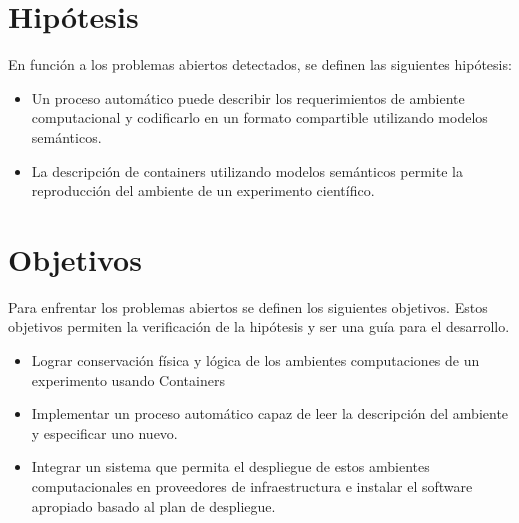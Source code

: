 \section{Hipótesis}

En función a los problemas abiertos detectados, se definen las siguientes hipótesis:

\begin{itemize}
	\item Un proceso automático puede describir los requerimientos de ambiente computacional y codificarlo en un formato compartible  utilizando modelos semánticos.
	\item La descripción de containers utilizando modelos semánticos permite la reproducción del ambiente de un experimento científico.
\end{itemize}


\section{Objetivos}

Para enfrentar los problemas abiertos se definen los siguientes objetivos. Estos objetivos permiten la verificación de la hipótesis y ser una guía para el desarrollo.



\begin{itemize}
	\item Lograr conservación física y lógica de los ambientes computaciones de un experimento usando Containers
	\item Implementar un proceso automático capaz de leer la descripción del ambiente y especificar uno nuevo.
	\item Integrar un sistema que permita el despliegue de estos ambientes computacionales en proveedores de infraestructura e instalar el software apropiado basado al plan de despliegue.

\end{itemize}
